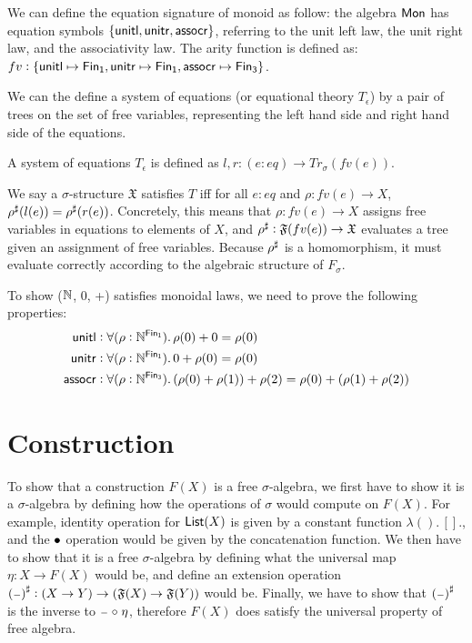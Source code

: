 \begin{example}
We can define the equation signature of monoid as follow: the algebra
$\mathsf{Mon}$ has equation symbols $\{\operatorname{\mathsf{unitl}}, \operatorname{\mathsf{unitr}}, \operatorname{\mathsf{assocr}}\}$,
referring to the unit left law, the unit right law, and the associativity law.
The arity function is defined as:
$fv : \{ \term{unitl} \mapsto \Fin[1], \term{unitr} \mapsto \Fin[1], \term{assocr} \mapsto \Fin[3] \}$.
\end{example}

We can the define a system of equations (or equational theory $T_\epsilon$)
by a pair of trees on the set of free variables, representing the
left hand side and right hand side of the equations.
\begin{definition}
A system of equations $T_\epsilon$ is defined as
$l, r : (e : eq) \to Tr_\sigma(fv(e))$.
\end{definition}

We say a $\sigma$-structure $\mathfrak{X}$ satisfies $T$
iff for all $e : eq$ and
$\rho : fv(e) \to X$, ${\rho}^{\sharp}(l(e)) = {\rho}^{\sharp}(r(e))$.
Concretely, this means that $\rho : fv(e) \to X$ assigns
free variables in equations to elements of $X$, and
${\rho}^{\sharp} : \mathfrak{F}(fv(e)) \to \mathfrak{X}$ evaluates
a tree given an assignment of free variables. Because ${\rho}^{\sharp}$
is a homomorphism, it must evaluate correctly according to the
algebraic structure of $F_\sigma$.

\begin{example}
To show ($\mathbb{N}$, 0, +) satisfies monoidal laws, we need to prove
the following properties:
\begin{align*}
\term{unitl}  & : \forall (\rho : \Nat^{\Fin[1]}). \, \rho(0) + 0 \id \rho(0) \\
\term{unitr}  & : \forall (\rho : \Nat^{\Fin[1]}). \, 0 + \rho(0) \id \rho(0) \\
\term{assocr} & : \forall (\rho : \Nat^{\Fin[3]}). \, (\rho(0) + \rho(1)) + \rho(2) \id \rho(0) + (\rho(1) + \rho(2))
\end{align*} 
\end{example}

\section{Construction}\label{algebra:tree}
To show that a construction $F(X)$ is a free $\sigma$-algebra, we first have to
show it is a $\sigma$-algebra by defining how the operations of $\sigma$
would compute on $F(X)$. For example, identity operation for $\operatorname{\mathsf{List}}(X)$
is given by a constant function $\lambda().\,[].$, and the $\mathbin{\bullet}$ operation
would be given by the concatenation function. We then have to show that
it is a free $\sigma$-algebra by defining what the universal map
$\eta : X \to F(X)$ would be, and define an extension operation
${({\scriptstyle{-}})}^{\sharp} : (X \to Y) \to (\mathfrak{F}(X) \to \mathfrak{F}(Y))$
would be. Finally, we have to show that ${({\scriptstyle{-}})}^{\sharp}$ is the inverse
to ${\scriptstyle{-}} \mathrel{\circ} \eta$, therefore $F(X)$ does satisfy the universal property
of free algebra.

